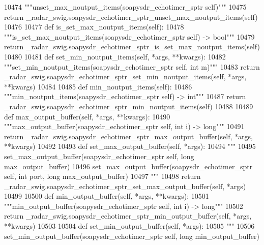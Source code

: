\begin{DoxyCode}
{{{{{{{{{{{{{{{{{{{{{{{{{{{{{{{{{10474         \textcolor{stringliteral}{"""unset\_max\_noutput\_items(soapysdr\_echotimer\_sptr self)"""}
10475         \textcolor{keywordflow}{return} \_radar\_swig.soapysdr\_echotimer\_sptr\_unset\_max\_noutput\_items(self)
10476 
10477     \textcolor{keyword}{def }is_set_max_noutput_items(self):
10478         \textcolor{stringliteral}{"""is\_set\_max\_noutput\_items(soapysdr\_echotimer\_sptr self) -> bool"""}
10479         \textcolor{keywordflow}{return} \_radar\_swig.soapysdr\_echotimer\_sptr\_is\_set\_max\_noutput\_items(self)
10480 
10481     \textcolor{keyword}{def }set_min_noutput_items(self, *args, **kwargs):
10482         \textcolor{stringliteral}{"""set\_min\_noutput\_items(soapysdr\_echotimer\_sptr self, int m)"""}
10483         \textcolor{keywordflow}{return} \_radar\_swig.soapysdr\_echotimer\_sptr\_set\_min\_noutput\_items(self, *args, **kwargs)
10484 
10485     \textcolor{keyword}{def }min_noutput_items(self):
10486         \textcolor{stringliteral}{"""min\_noutput\_items(soapysdr\_echotimer\_sptr self) -> int"""}
10487         \textcolor{keywordflow}{return} \_radar\_swig.soapysdr\_echotimer\_sptr\_min\_noutput\_items(self)
10488 
10489     \textcolor{keyword}{def }max_output_buffer(self, *args, **kwargs):
10490         \textcolor{stringliteral}{"""max\_output\_buffer(soapysdr\_echotimer\_sptr self, int i) -> long"""}
10491         \textcolor{keywordflow}{return} \_radar\_swig.soapysdr\_echotimer\_sptr\_max\_output\_buffer(self, *args, **kwargs)
10492 
10493     \textcolor{keyword}{def }set_max_output_buffer(self, *args):
10494         \textcolor{stringliteral}{"""}
10495 \textcolor{stringliteral}{        set\_max\_output\_buffer(soapysdr\_echotimer\_sptr self, long max\_output\_buffer)}
10496 \textcolor{stringliteral}{        set\_max\_output\_buffer(soapysdr\_echotimer\_sptr self, int port, long max\_output\_buffer)}
10497 \textcolor{stringliteral}{        """}
10498         \textcolor{keywordflow}{return} \_radar\_swig.soapysdr\_echotimer\_sptr\_set\_max\_output\_buffer(self, *args)
10499 
10500     \textcolor{keyword}{def }min_output_buffer(self, *args, **kwargs):
10501         \textcolor{stringliteral}{"""min\_output\_buffer(soapysdr\_echotimer\_sptr self, int i) -> long"""}
10502         \textcolor{keywordflow}{return} \_radar\_swig.soapysdr\_echotimer\_sptr\_min\_output\_buffer(self, *args, **kwargs)
10503 
10504     \textcolor{keyword}{def }set_min_output_buffer(self, *args):
10505         \textcolor{stringliteral}{"""}
10506 \textcolor{stringliteral}{        set\_min\_output\_buffer(soapysdr\_echotimer\_sptr self, long min\_output\_buffer)}
}}}}}}}}}}}}}}}}}}}}}}}}}}}}}}}}}
\end{DoxyCode}
